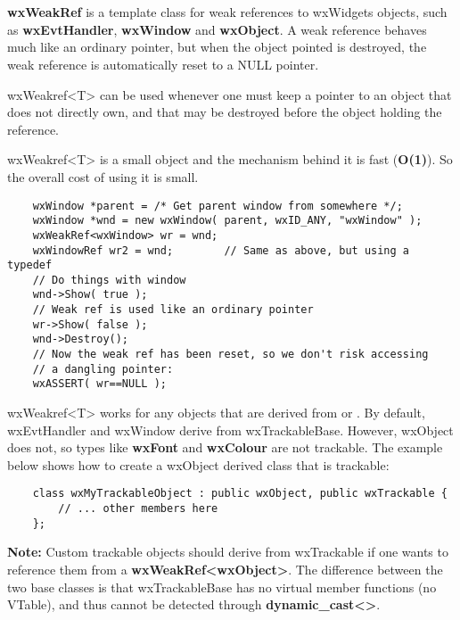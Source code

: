 \section{}\label{wxweakref}

{\bf wxWeakRef} is a template class for weak references to wxWidgets objects, 
such as {\bf wxEvtHandler}, {\bf wxWindow} and {\bf wxObject}. A weak 
reference behaves much like an ordinary pointer, but when the object pointed 
is destroyed, the weak reference is automatically reset to a NULL pointer. 

wxWeakref<T> can be used whenever one must keep a pointer to an object 
that does not directly own, and that may be destroyed before the object 
holding the reference. 

wxWeakref<T> is a small object and the mechanism behind it is fast 
({\bf O(1)}). So the overall cost of using it is small. 



\begin{verbatim}
    wxWindow *parent = /* Get parent window from somewhere */;
    wxWindow *wnd = new wxWindow( parent, wxID_ANY, "wxWindow" );
    wxWeakRef<wxWindow> wr = wnd;  
    wxWindowRef wr2 = wnd;        // Same as above, but using a typedef
    // Do things with window
    wnd->Show( true );
    // Weak ref is used like an ordinary pointer 
    wr->Show( false );
    wnd->Destroy(); 
    // Now the weak ref has been reset, so we don't risk accessing
    // a dangling pointer:
    wxASSERT( wr==NULL );
\end{verbatim}

wxWeakref<T> works for any objects that are derived from 
 or .
By default, wxEvtHandler and wxWindow derive from wxTrackableBase. However, 
wxObject does not, so types like {\bf wxFont} and 
{\bf wxColour} are not trackable. The example below shows how to create a 
wxObject derived class that is trackable: 

\begin{verbatim}
    class wxMyTrackableObject : public wxObject, public wxTrackable { 
        // ... other members here 
    }; 
\end{verbatim}

{\bf Note:} Custom trackable objects should derive from wxTrackable 
if one wants to reference them from a {\bf wxWeakRef<wxObject>}. The 
difference between the two base classes is that wxTrackableBase 
has no virtual member functions (no VTable), and thus cannot be detected
through {\bf dynamic_cast<>}.


